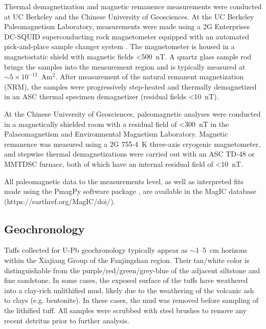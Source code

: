 Thermal demagnetization and magnetic remanence measurements were conducted at UC Berkeley and the Chinese University of Geosciences. At the UC Berkeley Paleomagnetism Laboratory, measurements were made using a 2G Enterprises DC-SQUID superconducting rock magnetometer equipped with an automated pick-and-place sample changer system \citep{Kirschvink2008a}. The magnetometer is housed in a magnetostatic shield with magnetic fields \textless500~nT. A quartz glass sample rod brings the samples into the measurement region and is typically measured at $\sim5\times10^{-12}$~Am$^{2}$. After measurement of the natural remanent magnetization (NRM), the samples were progressively step-heated and thermally demagnetized in an ASC thermal specimen demagnetizer (residual fields \textless10~nT).

At the Chinese University of Geosciences, paleomagnetic analyses were conducted in a magnetically shielded room with a residual field of \textless300~nT in the Palaeomagnetism and Environmental Magnetism Laboratory. Magnetic remanence was measured using a 2G 755-4~K three-axis cryogenic magnetometer, and stepwise thermal demagnetizations were carried out with an ASC TD-48 or MMTDSC furnace, both of which have an internal residual field of \textless10~nT.

All paleomagnetic data to the measurements level, as well as interpreted fits made using the PmagPy software package \citep{Tauxe2016a}, are available in the MagIC database (https://earthref.org/MagIC/doi/).

\subsection{Geochronology}

Tuffs collected for U-Pb geochronology typically appear as $\sim$1--5~cm horizons within the Xiajiang Group of the Fanjingshan region. Their tan/white color is distinguishable from the purple/red/green/grey-blue of the adjacent siltstone and fine sandstone. In some cases, the exposed surface of the tuffs have weathered into a clay-rich unlithified mud, likely due to the weathering of the volcanic ash to clays (e.g. bentonite). In these cases, the mud was removed before sampling of the lithified tuff. All samples were scrubbed with steel brushes to remove any recent detritus prior to further analysis.

